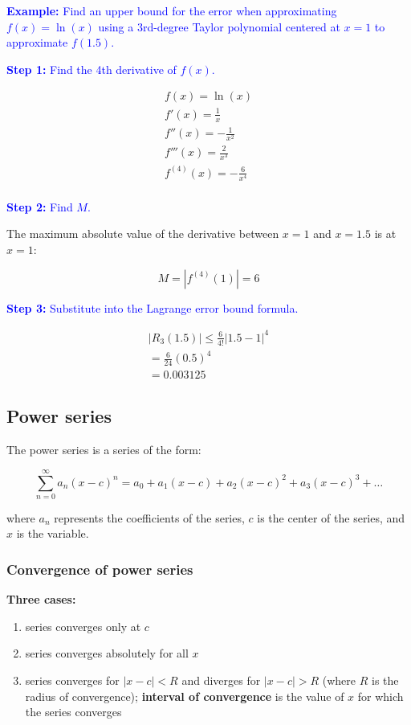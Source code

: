 \documentclass[letterpaper, 12pt]{article}
\newcommand{\example}[1]{\textcolor{blue}{\textbf{Example:} #1}}
\newcommand{\step}[2]{\textcolor{blue}{\textbf{Step #1:} #2}}
\begin{document}
\example{Find an upper bound for the error when approximating $f(x) = \ln(x)$ using a 3rd-degree Taylor polynomial centered at $x = 1$ to approximate $f(1.5)$.}

\step{1}{Find the 4th derivative of $f(x)$.}

\begin{gather*}
f(x) = \ln(x) \\
f'(x) = \frac{1}{x} \\
f''(x) = -\frac{1}{x^2} \\
f'''(x) = \frac{2}{x^3} \\
f^{(4)}(x) = -\frac{6}{x^4} \\
\end{gather*}

\step{2}{ Find $M$.}

The maximum absolute value of the derivative between $x = 1$ and $x = 1.5$ is at $x = 1$:

$$M = \left| f^{(4)}(1) \right| = 6$$

\step{3}{Substitute into the Lagrange error bound formula.}

\begin{gather*}
|R_3(1.5)| \leq \frac{6}{4!} |1.5 - 1|^4 \\
= \frac{6}{24} (0.5)^4 \\
= \boxed{0.003125}
\end{gather*}

\subsection*{Power series}

The power series is a series of the form:

$$\sum_{n=0}^\infty a_n (x-c)^n = a_0 + a_1 (x-c) + a_2 (x-c)^2 + a_3 (x-c)^3 + \dots$$

where $a_n$ represents the coefficients of the series, $c$ is the center of the series, and $x$ is the variable.

\subsubsection*{Convergence of power series}

\textbf{Three cases:}

\begin{enumerate}
\item series converges only at $c$
\item series converges absolutely for all $x$
\item series converges for $|x-c| < R$ and diverges for $|x-c| > R$ (where $R$ is the radius of convergence); \textbf{interval of convergence} is the value of $x$ for which the series converges
\end{enumerate}
\end{document}
